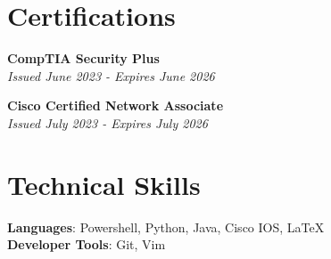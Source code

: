 \documentclass[letterpaper,20pt]{article}
\begin{document}
\resumeSubHeadingListEnd

\section{Certifications}
  \begin{itemize}[leftmargin=0.15in, label={}]
    \small{\item{
     \textbf{CompTIA Security Plus} \\
     \textit{Issued June 2023 - Expires June 2026} \\
    }}
 \end{itemize}
\begin{itemize}[leftmargin=0.15in, label={}]
    \small{\item{
     \textbf{Cisco Certified Network Associate} \\
     \textit{Issued July 2023 - Expires July 2026} \\
    }}
 \end{itemize}

\vspace{-5pt}
\section{Technical Skills}
	\begin{itemize}[leftmargin=0.15in, label={}]
    \small{\item{
     \textbf{Languages}{: Powershell, Python, Java, Cisco IOS, \LaTeX} \\
     \textbf{Developer Tools}{: Git, Vim} \\
    }}
 	\end{itemize}
\end{document}
